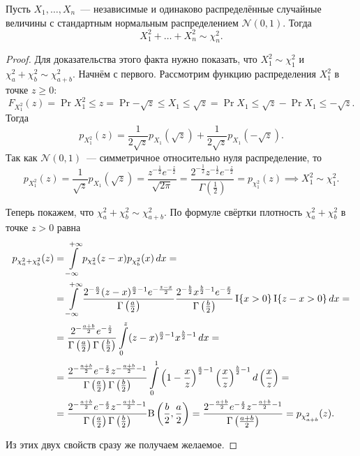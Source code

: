 \begin{lemma}
    Пусть \(X_{1}, \dots, X_{n}\)~--- независимые и одинаково распределённые случайные 
    величины с стандартным нормальным распределением \(\mathcal{N}(0, 1)\). Тогда
    \[
        X_{1}^{2} + \dots + X_{n}^{2} \sim \chi^{2}_{n}.
    \]
\end{lemma}
\begin{proof}
    Для доказательства этого факта нужно показать, что \(X_{1}^{2} \sim \chi^{2}_{1}\) и 
    \(\chi^{2}_{a} + \chi^{2}_{b} \sim \chi^{2}_{a + b}\). Начнём с первого. Рассмотрим 
    функцию распределения \(X_{1}^{2}\) в точке \(z \geq 0\):
    \[
        F_{X_{1}^{2}}(z) = \Pr{X_{1}^{2} \leq z} = \Pr{-\sqrt{z} \leq X_{1} \leq 
        \sqrt{z}} = \Pr{X_{1} \leq \sqrt{z}} - \Pr{X_{1} \leq -\sqrt{z}}.
    \]
    Тогда
    \[
        p_{X_{1}^{2}}(z) = \frac{1}{2\sqrt{z}}p_{X_{1}}(\sqrt{z}) + 
        \frac{1}{2\sqrt{z}}p_{X_{1}}(-\sqrt{z}).
    \]
    Так как \(\mathcal{N}(0, 1)\)~--- симметричное относительно нуля распределение, то
    \[
        p_{X_{1}^{2}}(z) = \frac{1}{\sqrt{z}}p_{X_{1}}(\sqrt{z}) = 
        \frac{z^{-\frac{1}{2}}e^{-\frac{z}{2}}}{\sqrt{2\pi}} = 
        \frac{2^{-\frac{1}{2}}z^{-\frac{1}{2}}e^{-\frac{z}{2}}} 
        {\Gamma\left(\frac{1}{2}\right)} = p_{\chi^{2}_{1}}(z) \implies X_{1}^{2} \sim 
        \chi^{2}_{1}.
    \]
    
    Теперь покажем, что \(\chi^{2}_{a} + \chi^{2}_{b} \sim \chi^{2}_{a + b}\). По формуле 
    свёртки плотность \(\chi^{2}_{a} + \chi^{2}_{b}\) в точке \(z > 0\) равна
    \begin{align*}
        p_{\chi^{2}_{a} + \chi^{2}_{b}}(z) &= \int\limits_{-\infty}^{+\infty} 
        p_{\chi^{2}_{a}}(z - x)p_{\chi^{2}_{b}}(x)\mathop{}\!d x = \\ 
        &= \int\limits_{-\infty}^{+\infty} \frac{2^{-\frac{a}{2}} (z - x)^{\frac{a}{2} - 
        1} e^{-\frac{z - x}{2}}}{\Gamma\left(\frac{a}{2}\right)} \frac{2^{-\frac{b}{2}} 
        x^{\frac{b}{2} - 1} e^{-\frac{x}{2}}}{\Gamma\left(\frac{b}{2}\right)} \operatorname{\mathrm{I}}\{x > 0\} 
        \operatorname{\mathrm{I}}\{z - x > 0\} \mathop{}\!d x = \\
        &= \frac{2^{-\frac{a + b}{2}}e^{-\frac{z}{2}}}{\Gamma\left(\frac{a}{2}\right) 
        \Gamma\left(\frac{b}{2}\right)} \int\limits_{0}^{z} (z - x)^{\frac{a}{2} - 
        1}x^{\frac{b}{2} - 1}\mathop{}\!d x = \\
        &= \frac{2^{-\frac{a + b}{2}}e^{-\frac{z}{2}}z^{-\frac{a + b}{2} - 
        1}}{\Gamma\left(\frac{a}{2}\right) \Gamma\left(\frac{b}{2}\right)} 
        \int\limits_{0}^{1} \left(1 - \frac{x}{z}\right)^{\frac{a}{2} - 
        1}\left(\frac{x}{z}\right)^{\frac{b}{2} - 1}\mathop{}\!d \left(\frac{x}{z}\right) = \\
        &= \frac{2^{-\frac{a + b}{2}}e^{-\frac{z}{2}}z^{-\frac{a + b}{2} - 
        1}}{\Gamma\left(\frac{a}{2}\right) \Gamma\left(\frac{b}{2}\right)} 
        \mathrm{B}\left(\frac{b}{2}, \frac{a}{2}\right) = \frac{2^{-\frac{a + 
        b}{2}}e^{-\frac{z}{2}}z^{-\frac{a + b}{2} - 1}}{\Gamma\left(\frac{a + 
        b}{2}\right)} = p_{\chi^{2}_{a + b}}(z).
    \end{align*}
    
    Из этих двух свойств сразу же получаем желаемое.
\end{proof}
